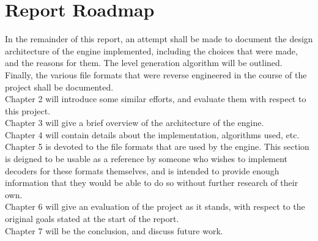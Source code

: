 	\section{Report Roadmap}
	In the remainder of this report, an attempt shall be made to document the design architecture of the engine  implemented, including the choices that were made, and the reasons for them. The level generation algorithm will be outlined. Finally, the various file formats that were reverse engineered in the course of the project shall be documented.\\
	Chapter 2 will introduce some similar efforts, and evaluate them with respect to this project.\\
	Chapter 3 will give a brief overview of the architecture of the engine.\\
	Chapter 4 will contain details about the implementation, algorithms used, etc. \\
	Chapter 5 is devoted to the file formats that are used by the engine. This section is deigned to be usable as a reference by someone who wishes to implement decoders for these formats themselves, and is intended to provide enough information that they would be able to do so without further research of their own.\\
	Chapter 6 will give an evaluation of the project as it stands, with respect to the original goals stated at the start of the report.\\
	Chapter 7 will be the conclusion, and discuss future work.
